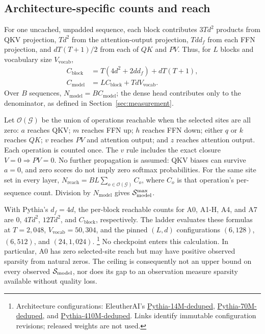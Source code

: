 \subsection{Architecture-specific counts and reach}
\label{app:architecture-counts}

For one uncached, unpadded sequence, each block contributes $3Td^2$ products
from QKV projection, $Td^2$ from the attention-output projection, $Td d_f$ from
each FFN projection, and $dT(T+1)/2$ from each of $QK$ and $PV$.
Thus, for $L$ blocks and vocabulary size $V_{\!\mathrm{vocab}}$,
\begin{equation}
\begin{split}
C_{\mathrm{block}}&=T(4d^2+2dd_f)+dT(T+1),\\
C_{\mathrm{model}}&=LC_{\mathrm{block}}+TdV_{\!\mathrm{vocab}}.
\end{split}
\label{eq:denominator}
\end{equation}
Over $B$ sequences, $N_{\mathrm{model}}=BC_{\mathrm{model}}$; the dense head
contributes only to the denominator, as defined in Section~\ref{sec:measurement}.

Let $\mathcal{O}(\mathcal{G})$ be the union of operations reachable when the
selected sites are all zero: $a$ reaches QKV; $m$ reaches FFN up; $h$ reaches
FFN down; either $q$ or $k$ reaches $QK$; $v$ reaches $PV$ and attention output;
and $z$ reaches attention output. Each operation is counted once.
The $v$ rule includes the exact closure $V=0\Rightarrow PV=0$. No further
propagation is assumed: QKV biases can survive $a=0$, and zero scores do not
imply zero softmax probabilities. For the same site set in every layer,
$N_{\mathrm{reach}}=BL\sum_{o\in\mathcal{O}(\mathcal{G})}C_o$, where $C_o$
is that operation's per-sequence count. Division by $N_{\mathrm{model}}$ gives
$\mathcal{S}_{\mathrm{model}}^{\max}$.

With Pythia's $d_f=4d$, the per-block reachable counts for A0, A1-H, A4, and A7
are $0$, $4Td^2$, $12Td^2$, and $C_{\mathrm{block}}$, respectively. The ladder
evaluates these formulas at $T=2{,}048$, $V_{\!\mathrm{vocab}}=50{,}304$, and
the pinned $(L,d)$ configurations $(6,128)$, $(6,512)$, and $(24,1{,}024)$.%
\footnote{Architecture configurations: EleutherAI's
\href{https://huggingface.co/EleutherAI/pythia-14m-deduped/blob/7386d9a4ae45aef494a6e704910394def3037fc5/config.json}{Pythia-14M-deduped},
\href{https://huggingface.co/EleutherAI/pythia-70m-deduped/blob/e93a9faa9c77e5d09219f6c868bfc7a1bd65593c/config.json}{Pythia-70M-deduped}, and
\href{https://huggingface.co/EleutherAI/pythia-410m-deduped/blob/b5e8535141902c0e985cea61fd02afe7fe86af32/config.json}{Pythia-410M-deduped}.
Links identify immutable configuration revisions; released weights are not used.}
No checkpoint enters this calculation. In particular, A0 has zero selected-site
reach but may have positive observed sparsity from natural zeros. The ceiling
is consequently not an upper bound on every observed $\mathcal{S}_{\mathrm{model}}$, nor does its
gap to an observation measure sparsity available without quality loss.


